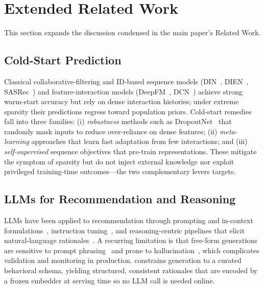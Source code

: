 \section{Extended Related Work}
\label{app:related_work}

This section expands the discussion condensed in the main paper's Related Work.

\subsection{Cold-Start Prediction}
Classical collaborative-filtering and ID-based sequence models (DIN~\cite{zhou2018din}, DIEN~\cite{zhou2019dien}, SASRec~\cite{kang2018sasrec}) and feature-interaction models (DeepFM~\cite{guo2017deepfm}, DCN~\cite{wang2017dcn}) achieve strong warm-start accuracy but rely on dense interaction histories; under extreme sparsity their predictions regress toward population priors. Cold-start remedies fall into three families: (i) \emph{robustness} methods such as DropoutNet~\cite{volkovs2017dropoutnet} that randomly mask inputs to reduce over-reliance on dense features; (ii) \emph{meta-learning} approaches that learn fast adaptation from few interactions; and (iii) \emph{self-supervised} sequence objectives that pre-train representations. These mitigate the symptom of sparsity but do not inject external knowledge nor exploit privileged training-time outcomes---the two complementary levers \modelname{} targets.

\subsection{LLMs for Recommendation and Reasoning}
LLMs have been applied to recommendation through prompting and in-context formulations~\cite{geng2022p5,gao2023chatrec}, instruction tuning~\cite{bao2023tallrec}, and reasoning-centric pipelines that elicit natural-language rationales~\cite{yue2025cot4rec,tsai2024llmreason,kim2025exp3rt,wu2023llmrec}. A recurring limitation is that free-form generations are sensitive to prompt phrasing~\cite{sclar2024quantifying} and prone to hallucination~\cite{ji2023survey}, which complicates validation and monitoring in production. \modelname{} constrains generation to a curated behavioral schema, yielding structured, consistent rationales that are encoded by a frozen embedder at serving time so no LLM call is needed online.

